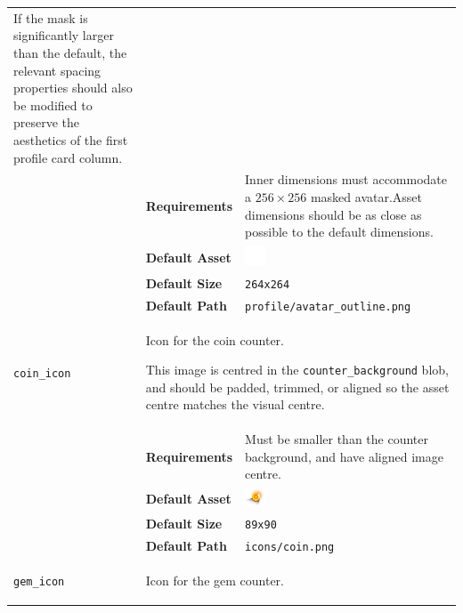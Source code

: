 \documentclass[a4paper, 10pt]{report}
\begin{document}
\begin{longtable}{| p{} p{} p{}|}
{    If the mask is significantly larger than the default, the relevant spacing properties should also be modified to preserve the aesthetics of the first profile card column.
  }\\
  & \textbf{Requirements} & Inner dimensions must accommodate a $256\times256$ masked avatar.\newline Asset dimensions should be as close as possible to the default dimensions.\\
  & \textbf{Default Asset} & \centering\arraybackslash\includegraphics[width=0.1\textwidth, valign=m]{../base/assets/profile/avatar_outline.png}\\
  & \textbf{Default Size} & \texttt{264x264}\\
  & \textbf{Default Path} & \texttt{profile/avatar\_outline.png}\\[2ex]
  \hypertarget{profile-coin-icon}{\texttt{coin\_icon}} & \multicolumn{2}{p{.70\textwidth+2\tabcolsep}|}{
    Icon for the coin counter.

    This image is centred in the \texttt{counter\_background} blob, and should be padded, trimmed, or aligned so the asset centre matches the visual centre.
  }\\
  & \textbf{Requirements} & Must be smaller than the counter background, and have aligned image centre.\\
  & \textbf{Default Asset} & \centering\arraybackslash\includegraphics[width=0.1\textwidth, valign=m]{../base/assets/icons/coin.png}\\
  & \textbf{Default Size} & \texttt{89x90}\\
  & \textbf{Default Path} & \texttt{icons/coin.png}\\[2ex]
  \hypertarget{profile-gem-icon}{\texttt{gem\_icon}} & \multicolumn{2}{p{.70\textwidth+2\tabcolsep}|}{
    Icon for the gem counter.

}
\end{longtable}
\end{document}
